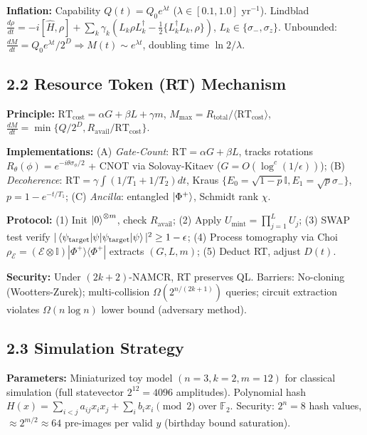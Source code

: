 \documentclass[a4paper,10pt,twoside]{article}
\begin{document}
\textbf{Inflation:} Capability $Q(t) = Q_0 e^{\lambda t}$ ($\lambda \in [0.1, 1.0]$ yr$^{-1}$). Lindblad $\frac{d\rho}{dt} = -i[\hat{H}, \rho] + \sum_k \gamma_k (L_k \rho L_k^\dagger - \frac{1}{2}\{L_k^\dagger L_k, \rho\})$, $L_k \in \{\sigma_-, \sigma_z\}$. Unbounded: $\frac{dM}{dt} = Q_0 e^{\lambda t}/2^D \Rightarrow M(t) \sim e^{\lambda t}$, doubling time $\ln 2/\lambda$.

\vspace{-3pt}
\subsection*{2.2 Resource Token (RT) Mechanism}
\vspace{-3pt}

\textbf{Principle:} $\text{RT}_{\text{cost}} = \alpha G + \beta L + \gamma m$, $M_{\max} = R_{\text{total}}/\langle \text{RT}_{\text{cost}} \rangle$, $\frac{dM}{dt} = \min\{Q/2^D, R_{\text{avail}}/\text{RT}_{\text{cost}}\}$.

\textbf{Implementations:} (A) \textit{Gate-Count}: $\text{RT} = \alpha G + \beta L$, tracks rotations $R_\theta(\phi) = e^{-i\theta\sigma_\phi/2}$ + CNOT via Solovay-Kitaev ($G = O(\log^c(1/\epsilon))$); (B) \textit{Decoherence}: $\text{RT} = \gamma \int (1/T_1 + 1/T_2) dt$, Kraus $\{E_0 = \sqrt{1-p}\mathbb{I}, E_1 = \sqrt{p}\sigma_-\}$, $p = 1-e^{-t/T_1}$; (C) \textit{Ancilla}: entangled $\ket{\Phi^+}$, Schmidt rank $\chi$.

\textbf{Protocol:} (1) Init $\ket{0}^{\otimes m}$, check $R_{\text{avail}}$; (2) Apply $U_{\text{mint}} = \prod_{j=1}^L U_j$; (3) SWAP test verify $|\braket{\psi_{\text{target}}|\psi}|^2 \geq 1-\epsilon$; (4) Process tomography via Choi $\rho_{\mathcal{E}} = (\mathcal{E}\otimes\mathbb{I})|\Phi^+\rangle\langle\Phi^+|$ extracts $(G,L,m)$; (5) Deduct RT, adjust $D(t)$.

\textbf{Security:} Under $(2k+2)$-NAMCR, RT preserves QL. Barriers: No-cloning (Wootters-Zurek); multi-collision $\Omega(2^{n/(2k+1)})$ queries; circuit extraction violates $\Omega(n\log n)$ lower bound (adversary method).

\vspace{-4pt}
\subsection*{2.3 Simulation Strategy}
\vspace{-4pt}

\textbf{Parameters:} Miniaturized toy model $(n=3, k=2, m=12)$ for classical simulation (full statevector $2^{12} = 4096$ amplitudes). Polynomial hash $H(x) = \sum_{i<j} a_{ij}x_ix_j + \sum_i b_i x_i \pmod{2}$ over $\mathbb{F}_2$. Security: $2^n = 8$ hash values, $\approx 2^{m/2} \approx 64$ pre-images per valid $y$ (birthday bound saturation).
\end{document}
